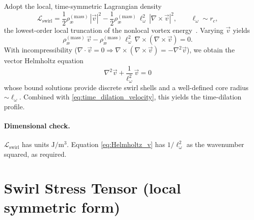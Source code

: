 \documentclass[12pt]{article}
\newcommand{\rc}{r_c}
\newcommand{\rhoa}{\rho_{\text{\ae}}^{(\text{mass})}}
\begin{document}
\begin{tcolorbox}[enhanced, breakable, sharp corners, colback=gray!2, colframe=black!40, title={Swirl-Based Hamiltonian, Time Dilation, and Emergent Geometry in VAM}]
        Adopt the local, time-symmetric Lagrangian density
        \begin{equation}
            \mathcal{L}_{\text{swirl}}=\frac{1}{2}\rhoa\,|\vec{v}|^{2}
            -\frac{1}{2}\rhoa\,\ell_\omega^{2}\,|\nabla\times\vec{v}|^{2},
            \qquad \ell_\omega\sim \rc,
            \label{eq:L_swirl}
        \end{equation}
        the lowest-order local truncation of the nonlocal vortex energy~\cite{Saffman1992,ChorinMarsden1993}. Varying \(\vec{v}\) yields
        \begin{equation}
            \rhoa\,\vec{v}
            -\rhoa\,\ell_\omega^{2}\,\nabla\times(\nabla\times\vec{v})=0.
        \end{equation}
        With incompressibility (\(\nabla\!\cdot\!\vec{v}=0\Rightarrow \nabla\times(\nabla\times\vec{v})=-\nabla^2\vec{v}\)), we obtain the vector Helmholtz equation
        \begin{equation}
            \boxed{\;\nabla^{2}\vec{v}+\frac{1}{\ell_\omega^{2}}\,\vec{v}=0\;}
            \label{eq:Helmholtz_v}
        \end{equation}
        whose bound solutions provide discrete swirl shells and a well-defined core radius \(\sim\ell_\omega\). Combined with \eqref{eq:time_dilation_velocity}, this yields the time-dilation profile.

        \paragraph{Dimensional check.}
        \(\mathcal{L}_{\text{swirl}}\) has units \(\mathrm{J/m^3}\). Equation \eqref{eq:Helmholtz_v} has \(1/\ell_\omega^{2}\) as the wavenumber squared, as required.

        \section{Swirl Stress Tensor (local symmetric form)}
        \label{sec:swirl_stress_tensor}


\end{tcolorbox}
\end{document}
